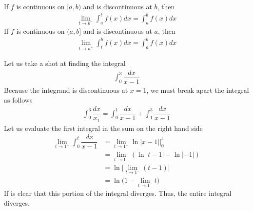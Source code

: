 \begin{definition}
If $f$ is continuous on $[a, b)$ and is discontinuous at $b$, then 
\begin{align*}
    \lim_{t \longrightarrow b^{-}} \int_{a}^{t} f(x) dx = \int_{a}^{b} f(x) dx
\end{align*}
If $f$ is continuous on $(a, b]$ and is discontinuous at $a$, then 
\begin{align*}
    \lim_{t \longrightarrow a^{+}} \int_{t}^{b} f(x) dx = \int_{a}^{b} f(x) dx
\end{align*}
\end{definition}

\begin{example}
Let us take a shot at finding the integral
\begin{align*}
    \int_{0}^{3} \dfrac{dx}{x - 1}
\end{align*}
Because the integrand is discontinuous at $x = 1$, we must break apart the integral as follows
\begin{align*}
    \int_{0}^{3} \dfrac{dx}{x_1} = \int_{0}^{1} \dfrac{dx}{x-1} + \int_{1}^{3} \dfrac{dx}{x-1} 
\end{align*}
Let us evaluate the first integral in the sum on the right hand side
\begin{align*}
    \lim_{t \longrightarrow 1^{-}} \int_{0}^{t} \dfrac{dx}{x-1} &= \lim_{t \longrightarrow 1^{-}} \ln \lvert x - 1 \rvert \Big|_{0}^{t}\\[2ex]
    &= \lim_{t \longrightarrow 1^{-}} (\ln \lvert t - 1 \rvert - \ln \lvert -1 \rvert)\\[2ex]
    &= \ln \Big\lvert \lim_{t \longrightarrow 1^{-}} (t - 1) \Big\rvert\\[2ex]
    &= \ln \Big(1 - \lim_{t \longrightarrow 1^{-}} t \Big)
\end{align*}
If is clear that this portion of the integral diverges. Thus, the entire integral diverges. 
\end{example}